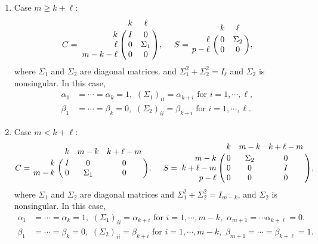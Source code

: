 \begin{enumerate}[\hspace{2em}(1)]
\item Case $m \ge k+\ell$: 
\[
                    C = \bordermatrix{ & k & \ell  \cr
                    \hfill k & I & 0 \cr
                    \hfill \ell & 0 & \Sigma_1 \cr
                    m-k-\ell & 0 & 0}, \  \ \ \
                    S = \bordermatrix{ & k & \ell \cr
                    \hfill \ell & 0 & \Sigma_2 \cr
                    \hfill p-\ell & 0 & 0},
\]
where $\Sigma_1$ and $\Sigma_2$ are diagonal matrices. 
and $\Sigma_1^2 + \Sigma_2^2 = I_{\ell}$ and $\Sigma_2$ is nonsingular. 
In this case, 
\begin{align*} 
\alpha_1 & =  \cdots = \alpha_k = 1, \,\,
  (\Sigma_1)_{ii} = \alpha_{k+i}\,\, \mbox{for $i = 1, \cdots, \ell$}, \\  
\beta_1  & = \cdots = \beta_k = 0, \,\,  
  (\Sigma_2)_{ii} = \beta_{k+i}\,\, \mbox{for $i = 1, \cdots, \ell$}.
\end{align*} 

 \item Case $m < k+\ell$: 
 \[
                    C = \bordermatrix{ & k & m-k & k+\ell-m  \cr
                    \hfill k & I & 0 & 0\cr
                    \hfill m-k & 0 & \Sigma_1 & 0}, \  \ \ \
                    S = \bordermatrix{ & k & m-k & k+\ell-m \cr
                    \hfill m-k & 0 & \Sigma_2 & 0\cr
                    \hfill k+\ell-m & 0 & 0 & I\cr
                    \hfill p-\ell & 0 & 0 & 0}, 
\]
where $\Sigma_1$ and $\Sigma_2$ are diagonal matrices 
and $\Sigma_1^2 + \Sigma_2^2 = I_{m-k}$, and $\Sigma_2$ is nonsingular. 
In this case, 
\begin{align*} 
\alpha_1 & =  \cdots = \alpha_k = 1, \,\,  
(\Sigma_1)_{ii} = \alpha_{k+i}\,\, \mbox{for $i = 1, \cdots, m-k$},\,\,
\alpha_{m+1} = \cdots \alpha_{k+\ell} = 0. \\
\beta_1 & = \cdots = \beta_k = 0, \,\,  
(\Sigma_2)_{ii} = \beta_{k+i}\,\, \mbox{for $i = 1, \cdots, m-k$}, \,\,  
\beta_{m+1} = \cdots = \beta_{k+\ell} = 1.
\end{align*} 


\end{enumerate}

